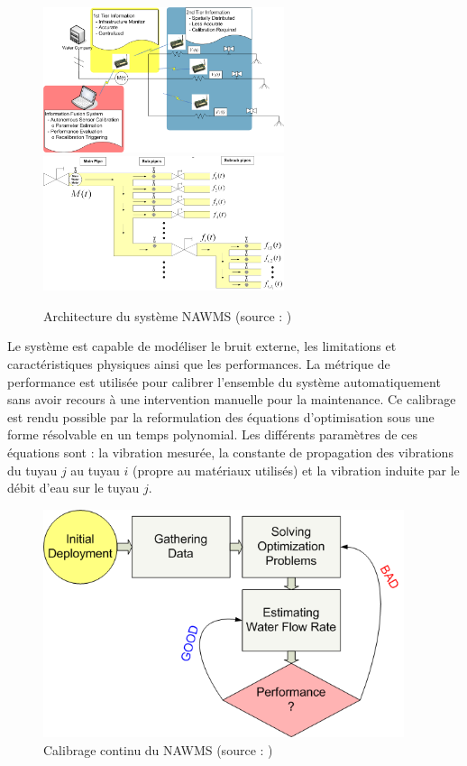 \documentclass[10pt, article]{llncs}
\begin{document}
			\begin{figure}
					\includegraphics[width=200pt]{img/nawms.png}
					\includegraphics[width=200pt]{img/nawms2.png}
				
				\begin{center}
					\caption{Architecture du système NAWMS (source : \cite{kim_nawms:_2008})}
				\end{center}
			\end{figure}
		
			Le système est capable de modéliser le bruit externe, les limitations et caractéristiques physiques ainsi que les performances. La métrique de performance est utilisée pour calibrer l'ensemble du système automatiquement sans avoir recours à une intervention manuelle pour la maintenance. Ce calibrage est rendu possible par la reformulation des équations d'optimisation sous une forme résolvable en un temps polynomial. Les différents paramètres de ces équations sont : la vibration mesurée, la constante de propagation des vibrations du tuyau $j$ au tuyau $i$ (propre au matériaux utilisés) et la vibration induite par le débit d'eau sur le tuyau $j$.
			\begin{figure}
				\begin{center}
					\includegraphics[width=300pt]{img/nawms3.png}
				\end{center}
				\caption{Calibrage continu du NAWMS (source : \cite{kim_nawms:_2008})}
			\end{figure}
		
\end{document}
